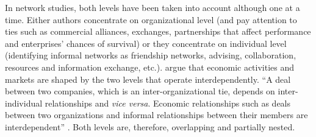 \documentclass[a4paper, 12pt, openright, oneside, german, french, brazil, english, article]{abntex2}
\begin{document}
	
	In network studies, both levels have been taken into account although one at a time. Either authors concentrate on organizational level (and pay attention to ties such as commercial alliances, exchanges, partnerships that affect performance and enterprises' chances of survival) or they concentrate on individual level (identifying informal networks as friendship networks, advising, collaboration, resources and information exchange, etc.).  argue that economic activities and markets are shaped by the two levels that operate interdependently. ``A deal between two companies, which is an inter-organizational tie, depends on inter-individual relationships and \textit{vice versa}. Economic relationships such as deals between two organizations and informal relationships between their members are interdependent'' \cite[p. 246]{brailly2016market}. Both levels are, therefore, overlapping and partially nested.
	
	
\end{document}
